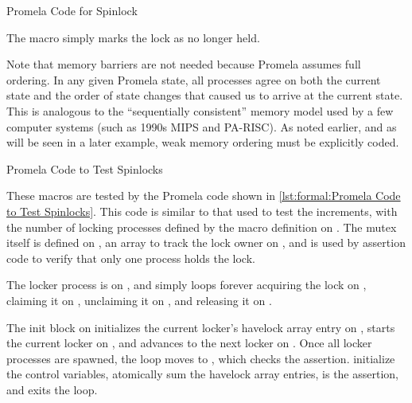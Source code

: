\begin{listing}

\caption{Promela Code for Spinlock}
\label{lst:formal:Promela Code for Spinlock}
\end{listing}

The  macro simply marks the lock as no
longer held.

Note that memory barriers are not needed because Promela assumes
full ordering.
In any given Promela state, all processes agree on both the current
state and the order of state changes that caused us to arrive at
the current state.
This is analogous to the ``sequentially consistent'' memory model
used by a few computer systems (such as 1990s MIPS and PA-RISC\@).
As noted earlier, and as will be seen in a later example,
weak memory ordering must be explicitly coded.

\begin{listing}

\caption{Promela Code to Test Spinlocks}
\label{lst:formal:Promela Code to Test Spinlocks}
\end{listing}

\begin{fcvref}
These macros are tested by the Promela code shown in
\cref{lst:formal:Promela Code to Test Spinlocks}.
This code is similar to that used to test the increments,
with the number of locking processes defined by the 
macro definition on .
The mutex itself is defined on ,
an array to track the lock owner
on , and  is used by assertion
code to verify that only one process holds the lock.
\end{fcvref}

\begin{fcvref}
The locker process is on , and simply loops forever
acquiring the lock on , claiming it on ,
unclaiming it on , and releasing it on .
\end{fcvref}

\begin{fcvref}
The init block on  initializes the current locker's
havelock array entry on , starts the current locker on
, and advances to the next locker on .
Once all locker processes are spawned, the  loop
moves to , which checks the assertion.
 initialize the control variables,
 atomically sum the havelock array entries,
 is the assertion, and  exits the loop.
\end{fcvref}

